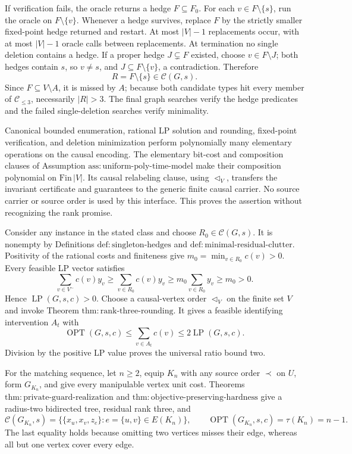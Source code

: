 If verification fails, the oracle returns a hedge \(F\subseteq F_0\).
For each \(v\in F\setminus\{s\}\), run the oracle on
\(F\setminus\{v\}\).  Whenever a hedge survives, replace \(F\) by the
strictly smaller fixed-point hedge returned and restart.  At most
\(|V|-1\) replacements occur, with at most \(|V|-1\) oracle calls between
replacements.  At termination no single deletion contains a hedge.  If a
proper hedge \(J\subsetneq F\) existed, choose
\(v\in F\setminus J\); both hedges contain \(s\), so \(v\neq s\), and
\(J\subseteq F\setminus\{v\}\), a contradiction.  Therefore
\[
 R=F\setminus\{s\}\in\mathcal C(G,s).
\]
Since \(F\subseteq V\setminus A\), it is missed by \(A\); because both
candidate types hit every member of \(\mathcal C_{\leq3}\), necessarily
\(|R|>3\).  The final graph searches verify the hedge predicates and the
failed single-deletion searches verify minimality.

Canonical bounded enumeration, rational LP solution and rounding,
fixed-point verification, and deletion minimization perform polynomially
many elementary operations on the causal encoding.  The elementary bit-cost
and composition clauses of Assumption
\(\mathrm{ass{:}uniform\mbox{-}poly\mbox{-}time\mbox{-}model}\) make their
composition polynomial on \(\mathrm{Fin}\,|V|\).  Its causal relabeling
clause, using \(\triangleleft_V\), transfers the invariant certificate and
guarantees to the generic finite causal carrier.  No source carrier or
source order is used by this interface.  This proves the assertion without
recognizing the rank promise.

Consider any instance in the stated class and choose
\(R_0\in\mathcal C(G,s)\).  It is nonempty by Definitions
\(\mathrm{def{:}singleton\mbox{-}hedges}\) and
\(\mathrm{def{:}minimal\mbox{-}residual\mbox{-}clutter}\).  Positivity of
the rational costs and finiteness give
\(m_0=\min_{v\in R_0}c(v)>0\).  Every feasible LP vector satisfies
\[
 \sum_{v\in V^{-}}c(v)y_v
 \geq\sum_{v\in R_0}c(v)y_v
 \geq m_0\sum_{v\in R_0}y_v
 \geq m_0>0.
\]
Hence \(\operatorname{LP}(G,s,c)>0\).  Choose a causal-vertex order
\(\triangleleft_V\) on the finite set \(V\) and invoke Theorem
\(\mathrm{thm{:}rank\mbox{-}three\mbox{-}rounding}\).  It gives a feasible
identifying intervention \(A_t\) with
\[
 \operatorname{OPT}(G,s,c)
 \leq\sum_{v\in A_t}c(v)
 \leq2\operatorname{LP}(G,s,c).
\]
Division by the positive LP value proves the universal ratio bound two.

For the matching sequence, let \(n\geq2\), equip \(K_n\) with any source
order \(\prec\) on \(U\), form \(G_{K_n}\), and give every manipulable
vertex unit cost.  Theorems
\(\mathrm{thm{:}private\mbox{-}guard\mbox{-}realization}\) and
\(\mathrm{thm{:}objective\mbox{-}preserving\mbox{-}hardness}\) give a
radius-two bidirected tree, residual rank three, and
\[
 \mathcal C(G_{K_n},s)
 =\bigl\{\{x_u,x_v,z_e\}:e=\{u,v\}\in E(K_n)\bigr\},
 \qquad
 \operatorname{OPT}(G_{K_n},s,c)=\tau(K_n)=n-1.
\]
The last equality holds because omitting two vertices misses their edge,
whereas all but one vertex cover every edge.

